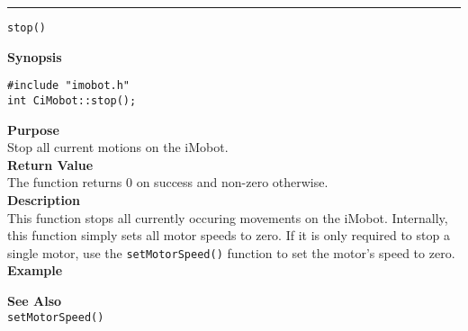 \noindent
\vspace{5pt}
\rule{6.5in}{0.015in}
\noindent
{\LARGE \texttt{stop()}}\\
{}

\noindent
{\bf Synopsis}\\
\begin{verbatim}
#include "imobot.h"
int CiMobot::stop();
\end{verbatim}

\noindent
{\bf Purpose}\\
Stop all current motions on the iMobot.\\

\noindent
{\bf Return Value}\\
The function returns 0 on success and non-zero otherwise.\\

\noindent
{\bf Description}\\
This function stops all currently occuring movements on the iMobot. Internally, this function simply sets all motor speeds to zero. If it is only required to stop a single motor, use the 
\texttt{setMotorSpeed()} function to set the motor's speed to zero. \\

\noindent
{\bf Example}\\
\noindent

\noindent
{\bf See Also}\\
\texttt{setMotorSpeed()}

